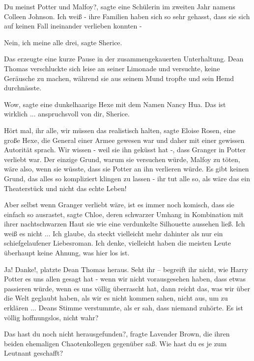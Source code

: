 \glqq{}Du meinst Potter und Malfoy?\grqq{}, sagte eine Schülerin im zweiten Jahr
namens Colleen Johnson. \glqq{}Ich weiß - ihre Familien haben sich so sehr
gehasst, dass sie sich auf keinen Fall ineinander verlieben konnten -\grqq{}

\glqq{}Nein, ich meine alle drei\grqq{}, sagte Sherice.

Das erzeugte eine kurze Pause in der zusammengekauerten Unterhaltung. Dean
Thomas verschluckte sich leise an seiner Limonade und versuchte, keine Geräusche
zu machen, während sie aus seinem Mund tropfte und sein Hemd durchnässte.

\glqq{}Wow\grqq{}, sagte eine dunkelhaarige Hexe mit dem Namen Nancy Hua. \glqq{}
Das ist wirklich ... anspruchsvoll von dir, Sherice.\grqq{}

\glqq{}Hört mal, ihr alle, wir müssen das realistisch halten\grqq{}, sagte Eloise
Rosen, eine große Hexe, die General einer Armee gewesen war und daher mit einer
gewissen Autorität sprach. \glqq{}Wir wissen - weil sie ihn geküsst hat -, dass
Granger in Potter verliebt war. Der einzige Grund, warum sie versuchen würde,
Malfoy zu töten, wäre also, wenn sie wüsste, dass sie Potter an ihn verlieren
würde. Es gibt keinen Grund, das alles so kompliziert klingen zu lassen - ihr
tut alle so, als wäre das ein Theaterstück und nicht das echte Leben!\grqq{}

\glqq{}Aber selbst wenn Granger verliebt wäre, ist es immer noch komisch, dass
sie einfach so ausrastet\grqq{}, sagte Chloe, deren schwarzer Umhang in
Kombination mit ihrer nachtschwarzen Haut sie wie eine verdunkelte Silhouette
aussehen ließ. \glqq{}Ich weiß es nicht ... Ich glaube, da steckt vielleicht mehr
dahinter als nur ein schiefgelaufener Liebesroman. Ich denke, vielleicht haben
die meisten Leute überhaupt keine Ahnung, was hier los ist.\grqq{}

\glqq{}Ja! Danke!\grqq{}, platzte Dean Thomas heraus. \glqq{}Seht ihr – begreift
ihr nicht, wie Harry Potter es uns allen gesagt hat - wenn wir nicht
vorausgesehen haben, dass etwas passieren würde, wenn es uns völlig überrascht
hat, dann reicht das, was wir über die Welt geglaubt haben, als wir es nicht
kommen sahen, nicht aus, um zu erklären ...\grqq{} Deans Stimme verstummte, als
er sah, dass niemand zuhörte. \glqq{}Es ist völlig hoffnungslos, nicht
wahr?\grqq{}

\glqq{}Das hast du noch nicht herausgefunden?\grqq{}, fragte Lavender Brown, die
ihren beiden ehemaligen Chaotenkollegen gegenüber saß. \glqq{}Wie hast du es je
zum Leutnant geschafft?\grqq{}

